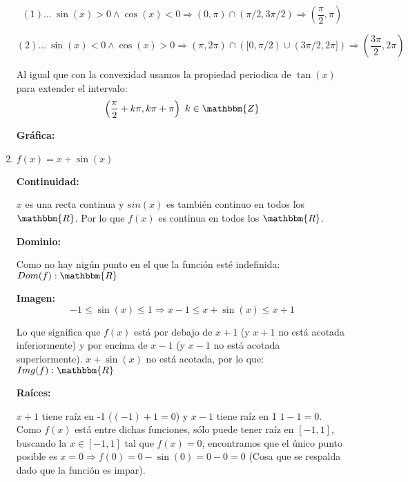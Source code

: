 \documentclass[12pt]{article}
\begin{document}
\begin{enumerate}[\hspace{9px} a)]
        \begin{equation*}
            (1) \dots \ \sin(x)>0 \wedge \cos(x)<0 \Longrightarrow (0,\pi) \cap (\pi/2,3\pi/2) \Longrightarrow \left(\frac{\pi}{2},\pi\right)
        \end{equation*}

        \begin{equation*}
            (2) \dots \ \sin(x)<0 \wedge \cos(x)>0 \Longrightarrow (\pi,2\pi) \cap ([0,\pi/2) \cup (3\pi/2,2\pi]) \Longrightarrow \left(\frac{3\pi}{2},2\pi\right)
        \end{equation*}

        Al igual que con la convexidad usamos la propiedad periodica de $\tan(x)$ para extender el intervalo:
        \[\left(\frac{\pi}{2}+k\pi,k\pi+\pi\right) \ k\in\mathbbm{Z}\]

        \textbf{Gr\'afica: }\medskip

    \item \(f(x)=x+\sin(x)\)\bigskip
    
    \textbf{Continuidad: }\medskip

        $x$ es una recta continua y \(sin(x)\) es tambi\'en continuo en todos los $\mathbbm{R}$. Por lo que \(f(x)\) es continua en todos los $\mathbbm{R}$.\medskip

    \textbf{Dominio: }\medskip

        Como no hay nig\'un punto en el que la funci\'on est\'e indefinida: \(Dom(f): \mathbbm{R}\)\medskip

    \textbf{Imagen: }\medskip
        \begin{equation*}
            -1\leq\sin(x)\leq1 \Longrightarrow x-1\leq x+\sin(x)\leq x+1
        \end{equation*}

        Lo que significa que \(f(x)\) est\'a por debajo de \(x+1\) (y \(x+1\) no est\'a acotada inferiormente) y por encima de \(x-1\) (y \(x-1\) no est\'a acotada superiormente). \(x+\sin(x)\) no est\'a acotada, por lo que: \(Img(f): \mathbbm{R}\)\medskip

    \textbf{Ra\'ices: }\medskip

        \(x+1\) tiene ra\'iz en -1 (\((-1)+1=0\)) y \(x-1\) tiene ra\'iz en 1 \(1-1=0\). Como \(f(x)\) est\'a entre dichas funciones, s\'olo puede tener ra\'iz en \([-1,1]\), buscando la \(x\in[-1,1]\) tal que \(f(x)=0\), encontramos que el \'unico punto posible es \(x=0 \Rightarrow f(0)=0-\sin(0)=0-0=0\) (Cosa que se respalda dado que la funci\'on es impar).\medskip


\end{enumerate}
\end{document}
